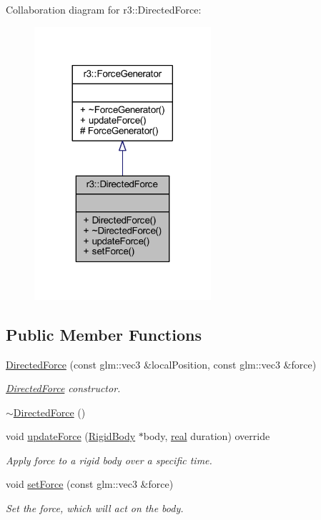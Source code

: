 Collaboration diagram for r3\+:\+:Directed\+Force\+:\nopagebreak
\begin{figure}[H]
\begin{center}
\leavevmode
\includegraphics[width=185pt]{classr3_1_1_directed_force__coll__graph}
\end{center}
\end{figure}
\subsection*{Public Member Functions}
\begin{DoxyCompactItemize}
\item 
\mbox{\hyperlink{classr3_1_1_directed_force_a01b61a6ebe0c54f92952d69e3d0cf09e}{Directed\+Force}} (const glm\+::vec3 \&local\+Position, const glm\+::vec3 \&force)
\begin{DoxyCompactList}\small\item\em \mbox{\hyperlink{classr3_1_1_directed_force}{Directed\+Force}} constructor. \end{DoxyCompactList}\item 
\mbox{\hyperlink{classr3_1_1_directed_force_a98aa1b750a187ba18a6fce0c530e397f}{$\sim$\+Directed\+Force}} ()
\item 
void \mbox{\hyperlink{classr3_1_1_directed_force_ac723ddeef767956d16fb9d0a1d706bfd}{update\+Force}} (\mbox{\hyperlink{classr3_1_1_rigid_body}{Rigid\+Body}} $\ast$body, \mbox{\hyperlink{namespacer3_ab2016b3e3f743fb735afce242f0dc1eb}{real}} duration) override
\begin{DoxyCompactList}\small\item\em Apply force to a rigid body over a specific time. \end{DoxyCompactList}\item 
void \mbox{\hyperlink{classr3_1_1_directed_force_a5c25cdaa94e053ffd2614472d2a04c7e}{set\+Force}} (const glm\+::vec3 \&force)
\begin{DoxyCompactList}\small\item\em Set the force, which will act on the body. \end{DoxyCompactList}\end{DoxyCompactItemize}
